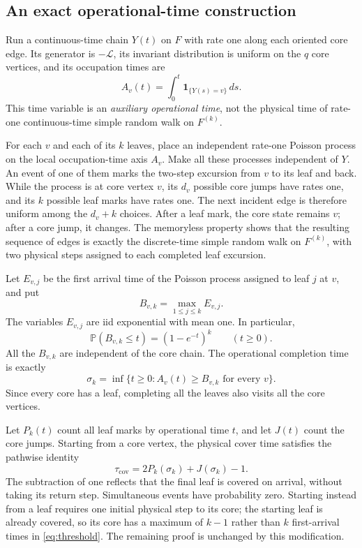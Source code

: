 \documentclass[11pt]{amsart}
\theoremstyle{remark}
\numberwithin{equation}{section}
\newcommand{\Prob}{\mathbb{P}}
\newcommand{\taucov}{\tau_{\mathrm{cov}}}
\newcommand{\Lap}{\mathcal{L}}
\newcommand{\ind}{\mathbf{1}}
\begin{document}
\subsection{An exact operational-time construction}\label{subsec:operational}
Run a continuous-time chain $Y(t)$ on $F$ with rate one along each oriented core edge. Its generator is $-\Lap$, its invariant distribution is uniform on the $q$ core vertices, and its occupation times are
\[
A_v(t)=\int_0^t\ind_{\{Y(s)=v\}}\,ds.
\]
This time variable is an \emph{auxiliary operational time}, not the physical time of rate-one continuous-time simple random walk on $F^{(k)}$.

For each $v$ and each of its $k$ leaves, place an independent rate-one Poisson process on the local occupation-time axis $A_v$. Make all these processes independent of $Y$. An event of one of them marks the two-step excursion from $v$ to its leaf and back. While the process is at core vertex $v$, its $d_v$ possible core jumps have rates one, and its $k$ possible leaf marks have rates one. The next incident edge is therefore uniform among the $d_v+k$ choices. After a leaf mark, the core state remains $v$; after a core jump, it changes. The memoryless property shows that the resulting sequence of edges is exactly the discrete-time simple random walk on $F^{(k)}$, with two physical steps assigned to each completed leaf excursion.

Let $E_{v,j}$ be the first arrival time of the Poisson process assigned to leaf $j$ at $v$, and put
\begin{equation}\label{eq:threshold}
B_{v,k}=\max_{1\le j\le k}E_{v,j}.
\end{equation}
The variables $E_{v,j}$ are iid exponential with mean one. In particular,
\begin{equation}\label{eq:thresholdlaw}
\Prob(B_{v,k}\le t)=(1-e^{-t})^k\qquad(t\ge 0).
\end{equation}
All the $B_{v,k}$ are independent of the core chain. The operational completion time is exactly
\begin{equation}\label{eq:sigmadef}
\sigma_k=\inf\{t\ge 0:A_v(t)\ge B_{v,k}\text{ for every }v\}.
\end{equation}
Since every core has a leaf, completing all the leaves also visits all the core vertices.

Let $P_k(t)$ count all leaf marks by operational time $t$, and let $J(t)$ count the core jumps. Starting from a core vertex, the physical cover time satisfies the pathwise identity
\begin{equation}\label{eq:pathwise}
\taucov=2P_k(\sigma_k)+J(\sigma_k)-1.
\end{equation}
The subtraction of one reflects that the final leaf is covered on arrival, without taking its return step. Simultaneous events have probability zero. Starting instead from a leaf requires one initial physical step to its core; the starting leaf is already covered, so its core has a maximum of $k-1$ rather than $k$ first-arrival times in \eqref{eq:threshold}. The remaining proof is unchanged by this modification.
\end{document}

